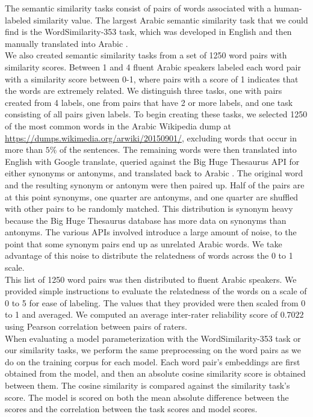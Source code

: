 The semantic similarity tasks consist of pairs of words associated with a human-labeled similarity value. The largest Arabic semantic similarity task that we could find is the WordSimilarity-353 task, which was developed in English and then manually translated into Arabic \cite{finkelstein:2001,hassan:2009}. 
\\
We also created semantic similarity tasks from a set of 1250 word pairs with similarity scores. Between 1 and 4 fluent Arabic speakers labeled each word pair with a similarity score between 0-1, where pairs with a score of 1 indicates that the words are extremely related. We distinguish three tasks, one with pairs created from 4 labels, one from pairs that have 2 or more labels, and one task consisting of all pairs given labels. To begin creating these tasks, we selected 1250 of the most common words in the Arabic Wikipedia dump \cite{wiki:xxx} at \url{https://dumps.wikimedia.org/arwiki/20150901/}, excluding words that occur in more than $5\%$ of the sentences. The remaining words were then translated into English with Google translate, queried against the Big Huge Thesaurus API for either synonyms or antonyms, and translated back to Arabic \cite{google:online,bhl:online}. The original word and the resulting synonym or antonym were then paired up. Half of the pairs are at this point synonyms, one quarter are antonyms, and one quarter are shuffled with other pairs to be randomly matched. This distribution is synonym heavy because the Big Huge Thesaurus database has more data on synonyms than antonyms. The various APIs involved introduce a large amount of noise, to the point that some synonym pairs end up as unrelated Arabic words. We take advantage of this noise to distribute the relatedness of words across the 0 to 1 scale.
\\
This list of 1250 word pairs was then distributed to fluent Arabic speakers. We provided simple instructions to evaluate the relatedness of the words on a scale of 0 to 5 for ease of labeling. The values that they provided were then scaled from 0 to 1 and averaged. We computed an average inter-rater reliability score of $0.7022$ using Pearson correlation between pairs of raters.
\\
When evaluating a model parameterization with the WordSimilarity-353 task or our similarity tasks, we perform the same preprocessing on the word pairs as we do on the training corpus for each model. Each word pair's embeddings are first obtained from the model, and then an absolute cosine similarity score is obtained between them. The cosine similarity is compared against the similarity task's score. The model is scored on both the mean absolute difference between the scores and the correlation between the task scores and model scores.


